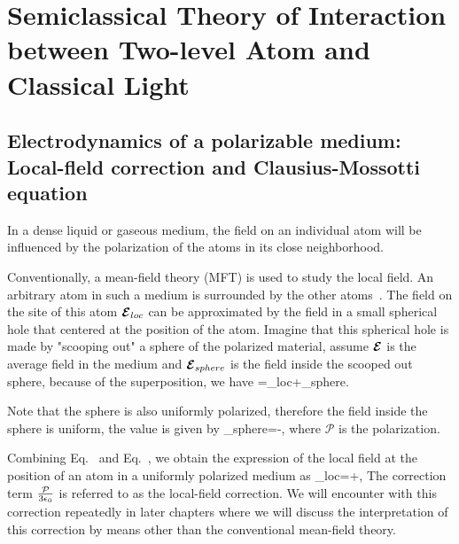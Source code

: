 \chapter{Semiclassical Theory of Interaction between Two-level Atom and Classical Light}

\section{Electrodynamics of a polarizable medium: Local-fleld correction and Clausius-Mossotti equation}

In a dense liquid or gaseous medium, the field on an individual atom will be influenced by the polarization of the atoms in its close neighborhood. %

Conventionally, a mean-field theory (MFT) is used to study the local field. An arbitrary atom in such a medium is surrounded by the other atoms~\cite{feynman}. The field on the site of this atom $\cbE_{loc}$ can be approximated by the field in a small spherical hole that centered at the position of the atom. Imagine that this spherical hole is made by "scooping out" a sphere of the polarized material, assume $\cbE$ is the average field in the medium and $\cbE_{sphere}$ is the field inside the scooped out sphere, because of the superposition, we have
\bea
\cbE=\cbE_{loc}+\cbE_{sphere}.
\label{E_MEAN}
\eea

Note that the sphere is also uniformly polarized, therefore the field inside the sphere is uniform, the value is given by
\bea
\cbE_{sphere}=-,
\label{E_SPHERE}
\eea
where  $\mathcal{P}$ is the polarization.

Combining Eq.~ and Eq.~, we obtain the expression of the local field at the position of an atom in a uniformly polarized medium as
\bea
\cbE_{loc}=\cbE+,
\label{LOCAL_FIELD}
\eea
The correction term $\frac{\mathbf{\cal{P}}}{3\epsilon_0}$  is referred to as the local-field correction. We will encounter with this correction repeatedly in later chapters where we will discuss the interpretation of this correction by means other than the conventional mean-field theory.

